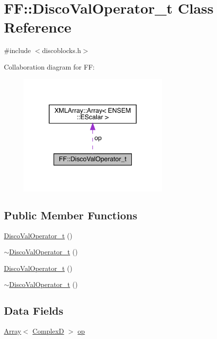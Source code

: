 \hypertarget{classFF_1_1DiscoValOperator__t}{}\section{FF\+:\+:Disco\+Val\+Operator\+\_\+t Class Reference}
\label{classFF_1_1DiscoValOperator__t}


{\ttfamily \#include $<$discoblocks.\+h$>$}



Collaboration diagram for FF\+:\nopagebreak
\begin{figure}[H]
\begin{center}
\leavevmode
\includegraphics[width=214pt]{d5/d04/classFF_1_1DiscoValOperator__t__coll__graph}
\end{center}
\end{figure}
\subsection*{Public Member Functions}
\begin{DoxyCompactItemize}
\item 
\mbox{\hyperlink{classFF_1_1DiscoValOperator__t_a818e9637a1ac97359f1e611f1f524761}{Disco\+Val\+Operator\+\_\+t}} ()
\item 
\mbox{\hyperlink{classFF_1_1DiscoValOperator__t_aff2684b99129c3fa09b915d69abeb421}{$\sim$\+Disco\+Val\+Operator\+\_\+t}} ()
\item 
\mbox{\hyperlink{classFF_1_1DiscoValOperator__t_a818e9637a1ac97359f1e611f1f524761}{Disco\+Val\+Operator\+\_\+t}} ()
\item 
\mbox{\hyperlink{classFF_1_1DiscoValOperator__t_aff2684b99129c3fa09b915d69abeb421}{$\sim$\+Disco\+Val\+Operator\+\_\+t}} ()
\end{DoxyCompactItemize}
\subsection*{Data Fields}
\begin{DoxyCompactItemize}
\item 
\mbox{\hyperlink{classXMLArray_1_1Array}{Array}}$<$ \mbox{\hyperlink{group__defs_gaf38ee8c84f090ee0c3b76e7a384fb316}{ComplexD}} $>$ \mbox{\hyperlink{classFF_1_1DiscoValOperator__t_a1ed72a6f794e1427a944385c0d54d679}{op}}
\end{DoxyCompactItemize}


